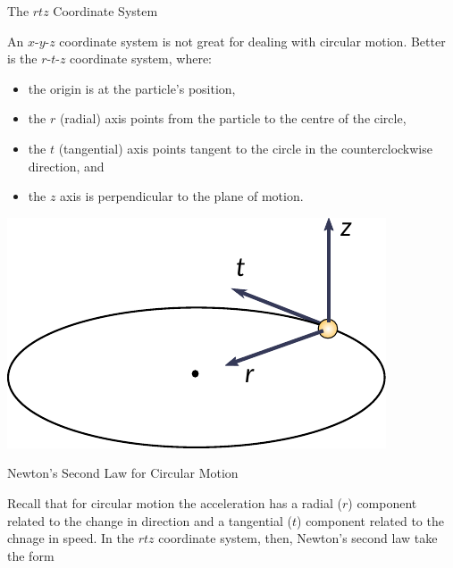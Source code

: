 \documentclass{summarysheet}
\begin{document}


\begin{multicols}{2}

\begin{topicbox}{The $rtz$ Coordinate System}

\noindent An $x$-$y$-$z$ coordinate system is not great for dealing with circular motion.  Better is the $r$-$t$-$z$ coordinate system, where:
\begin{itemize}
\item the origin is at the particle's position,
\item the $r$ (radial) axis points from the particle to the centre of the circle,
\item the $t$ (tangential) axis points tangent to the circle in the counterclockwise direction, and
\item the $z$ axis is perpendicular to the plane of motion.
\end{itemize}

\begin{center}
\includegraphics[scale=0.6]{fig_rtz.pdf}
\end{center}

\end{topicbox}

\begin{topicbox}{Newton's Second Law for Circular Motion}

\noindent Recall that for circular motion the acceleration has a radial ($r$) component related to the change in direction and a tangential ($t$) component related to the chnage in speed.  In the $rtz$ coordinate system, then, Newton's second law take the form


\end{topicbox}
\end{multicols}
\end{document}
